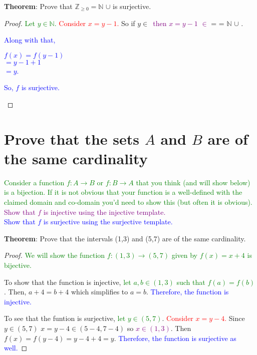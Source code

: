 \documentclass[11pt, oneside]{article}
\begin{document}
\noindent \textbf{Theorem}: Prove that $\mathbb{Z}_{\geq 0}=\mathbb{N}$ $\cup$ \textbraceright is surjective.

\begin{proof}
\textcolor{green}{Let $y\in \mathbb{N}$.}
\textcolor{red}{Consider $x=y-1$.}
So if $y\in$\textbraceright\ 
\textcolor{purple}{then $x=y-1$ $\in$} = \textbraceright = $\mathbb{N}$ $\cup$ \textbraceright.
\textcolor{blue}{Along with that,
\begin{center}
$f(x)=f(y-1)$\\
$=y-1+1$\\
$=y$. 
\end{center}
So, $f$ is surjective.}
\end{proof}


	           \newpage
            
\section{Prove that the sets $A$ and $B$ are of the same cardinality}

		\begin{center}
		\textcolor{green}{Consider a function $f: A \rightarrow B$ or $f: B \rightarrow A$ that you think (and will show below) is a bijection.    If it is not obvious that your function is a 			well-defined  with the claimed domain and co-domain you'd need to show this (but often it is obvious).}\\[0.2in]
		\textcolor{purple}{Show that $f$ is injective using the injective template.}\\[0.2in]
		\textcolor{blue}{Show that $f$ is surjective using the surjective template.}
		\end{center}
		
\noindent \textbf{Theorem}:  Prove that the intervals (1,3) and (5,7) are of the same cardinality.      
\begin{proof}
\textcolor{green}{We will show the function $f:(1,3) \rightarrow(5,7)$ given by $f(x)=x+4$ is bijective.} 
\par To show that the function is injective, \textcolor{green}{let $a,b \in (1,3)$ such that $f(a)=f(b)$}. Then, $a+4=b+4$ which simplifies to $a=b$. \textcolor{blue}{Therefore, the function is injective.} 

\par To see that the funtion is surjective, \textcolor{green}{let $y \in (5,7)$}. \textcolor{red}{Consider $x=y-4$.} Since $y\in (5,7)$ $x=y-4 \in (5-4, 7-4)$ so \textcolor{purple}{$x\in (1,3)$}. Then $f(x)=f(y-4)=y-4+4=y$. \textcolor{blue}{Therefore, the function is surjective as well.}
\end{proof}

           
\end{document}
